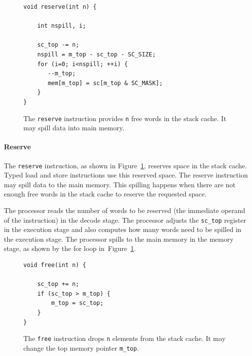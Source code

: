\documentclass[a4paper,fontsize=10pt,twoside,DIV15,BCOR12mm,headinclude=true,footinclude=false,pagesize,bibtotoc]{scrbook}
\newcommand{\code}[1]{{\texttt{#1}}}
\begin{document}
%
%
%
%
%
%

\begin{figure}
\begin{lstlisting}
void reserve(int n) {

    int nspill, i;

    sc_top -= n;
    nspill = m_top - sc_top - SC_SIZE;
    for (i=0; i<nspill; ++i) {
       --m_top;
       mem[m_top] = sc[m_top & SC_MASK];
    }
}
	\end{lstlisting}
 	 \caption{The \code{reserve} instruction provides \code{n}
	 free words in the stack cache. It may spill data into main memory.}
 	 \label{fig:res_iml}
\end{figure}


\paragraph{Reserve} The \code{reserve} instruction, as shown in Figure~\ref{fig:res_iml},
reserves space in the stack cache. Typed load and store instructions use
this reserved space. The reserve instruction may spill data to the
main memory. This spilling happens when there are not enough free words in the
stack cache to reserve the requested space.

The processor reads the number of words to be reserved
(the immediate operand of the instruction) in the decode stage.
The processor adjusts the \code{sc\_top} register in the execution
stage and also computes how many words need to be spilled in the
execution stage. The processor spills to the main memory
in the memory stage, as shown by the for loop in~Figure~\ref{fig:res_iml}.

\begin{figure}
\begin{lstlisting}
void free(int n) {

    sc_top += n;
    if (sc_top > m_top) {
        m_top = sc_top;
    }
}
\end{lstlisting}
	\caption{The \code{free} instruction drops \code{n}
	elements from the stack cache. It may change the top memory
	pointer \code{m\_top}.}
 	 \label{fig:free_iml}
\end{figure}
\end{document}
